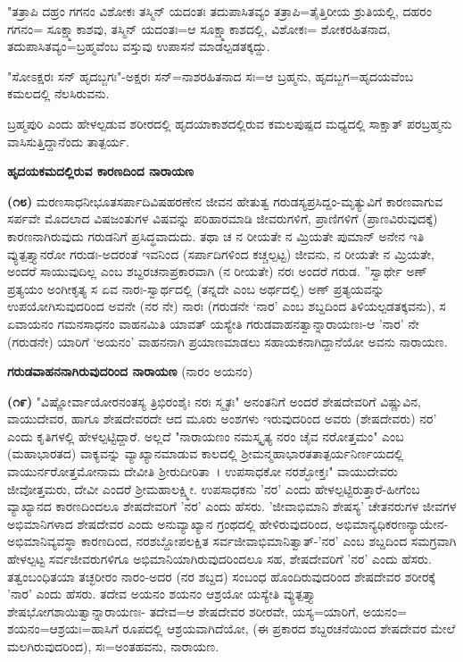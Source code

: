 "ತತ್ರಾಪಿ ದಹ್ರಂ ಗಗನಂ ವಿಶೋಕಃ ತಸ್ಮಿನ್ ಯದಂತಃ ತದುಪಾಸಿತವ್ಯಂ ತತ್ರಾಪಿ=\break ತೈತ್ತಿರೀಯ ಶ್ರುತಿಯಲ್ಲಿ, ದಹರಂ ಗಗನಂ= ಸೂಕ್ಷ್ಮಾಕಾಶವು, ತಸ್ಮಿನ್ ಯದಂತಃ=ಆ ಸೂಕ್ಷ್ಮಾಕಾಶದಲ್ಲಿ, ವಿಶೋಕಃ= ಶೋಕರಹಿತನಾದ, ತದುಪಾಸಿತವ್ಯಂ=ಬ್ರಹ್ಮವೆಂಬ ವಸ್ತುವು ಉಪಾಸನೆ ಮಾಡಲ್ಪಡತಕ್ಕದ್ದು.

"ಸೋಽಕ್ಷರಃ ಸನ್ ಹೃದಬ್ಜಗಃ"-ಅಕ್ಷರಃ ಸನ್=ನಾಶರಹಿತನಾದ ಸಃ=ಆ ಬ್ರಹ್ಮನು, ಹೃದಬ್ಜಗ=ಹೃದಯವೆಂಬ ಕಮಲದಲ್ಲಿ ನೆಲಸಿರುವನು.

ಬ್ರಹ್ಮಪುರಿ ಎಂದು ಹೇಳಲ್ಪಡುವ ಶರೀರದಲ್ಲಿ ಹೃದಯಾಕಾಶದಲ್ಲಿರುವ ಕಮಲಪುಷ್ಪದ ಮಧ್ಯದಲ್ಲಿ ಸಾಕ್ಷಾತ್ ಪರಬ್ರಹ್ಮನು ವಾಸಿಸುತ್ತಿದ್ದಾನೆಂದು ತಾತ್ಪರ್ಯ.

\begin{center}
\textbf{ಹೃದಯಕಮದಲ್ಲಿರುವ ಕಾರಣದಿಂದ ನಾರಾಯಣ}
\end{center}

\textbf{(೧೮)} ಮರಣಸಾಧನೀಭೂತಸರ್ಪಾದಿವಿಷಹರಣೇನ ಜೀವನ ಹೇತುತ್ವ ಗರುಡಸ್ಯ\break ಪ್ರಸಿದ್ದಂ-ಮೃತ್ಯುವಿಗೆ ಕಾರಣವಾಗುವ ಸರ್ಪವೇ ಮೊದಲಾದ ವಿಷಜಂತುಗಳ ವಿಷವನ್ನು ಪರಿಹಾರಮಾಡಿ ಜೀವರುಗಳಿಗೆ, ಪ್ರಾಣಿಗಳಿಗೆ (ಪ್ರಾಣವಿರುವುದಕ್ಕೆ) ಕಾರಣನಾಗಿರುವುದು ಗರುಡನಿಗೆ ಪ್ರಸಿದ್ಧವಾದುದು. ತಥಾ ಚ ನ ರೀಯತೇ ನ ಮ್ರಿಯತೇ ಪುಮಾನ್ ಅನೇನ ಇತಿ ವ್ಯುತ್ಪತ್ತ್ಯಾನರೋ ಗರುಡಃ-ಅದರಂತೆ ಇವನಿಂದ (ಸರ್ಪಾದಿಗಳಿಂದ ಕಚ್ಚಲ್ಪಟ್ಟ) ಜೀವನು, ನ ರೀಯತೇ ನ ಮ್ರಿಯತೇ, ಅಂದರೆ ಸಾಯುವುದಿಲ್ಲ ಎಂಬ ಶಬ್ದರಚನಾಪ್ರಕಾರವಾಗಿ (ನ ರೀಯತೇ) ನರಃ ಅಂದರೆ ಗರುಡ. ''ಸ್ವಾರ್ಥೇ ಅಣ್ ಪ್ರತ್ಯಯಂ ಅಂಗೀಕೃತ್ಯ ಸ ಏವ ನಾರಃ-\-ಸ್ವಾರ್ಥದಲ್ಲಿ (ತನ್ನದೇ ಎಂಬ ಅರ್ಥದಲ್ಲಿ) ಅಣ್ ಪ್ರತ್ಯಯವನ್ನು ಉಪಯೋಗಿಸುವುದರಿಂದ ಅವನೇ (ನರ ನೇ) ನಾರಃ (ಗರುಡನೇ `ನಾರ' ಎಂಬ ಶಬ್ದದಿಂದ ತಿಳಿಯಲ್ಪಡತಕ್ಕವನು), ಸ ಏವಾಯನಂ ಗಮನಸಾಧನಂ ವಾಹನಮಿತಿ ಯಾವತ್‌ ಯಸ್ಯೇತಿ ಗರುಡವಾಹನತ್ವಾನ್ನಾರಾಯಣಃ-ಆ 'ನಾರ' ನೇ (ಗರುಡನೇ) ಯಾರಿಗೆ `ಅಯನಂ' ವಾಹನನಾಗಿ ಪ್ರಯಾಣಮಾಡಲು ಸಹಾಯಕನಾಗಿದ್ದಾನೆಯೋ ಅವನು ನಾರಾಯಣ.

\begin{center}
\textbf{ಗರುಡವಾಹನನಾಗಿರುವುದರಿಂದ ನಾರಾಯಣ} (ನಾರಂ ಅಯನಂ)
\end{center}

\textbf{(೧೯)} "ವಿಷ್ಣೋರ್ವಾಯೋರನಂತಸ್ಯ ತ್ರಿಭಿರಂಶೈಃ ನರಃ ಸ್ಮೃತಃ" ಅನಂತನಿಗೆ ಅಂದರೆ ಶೇಷದೇವರಿಗೆ ವಿಷ್ಣುವಿನ, ವಾಯುದೇವರ, ಹಾಗೂ ಶೇಷದೇವರದೇ ಆದ ಮೂರು ಅಂಶಗಳು ಇರುವುದರಿಂದ ಅವರು (ಶೇಷದೇವರು) ನರ' ಎಂದು ಕೃತಿಗಳಲ್ಲಿ ಹೇಳಲ್ಪಟ್ಟಿದ್ದಾರೆ. ಅಲ್ಲದೆ "ನಾರಾಯಣಂ ನಮಸ್ಕೃತ್ಯ ನರಂ ಚೈವ ನರೋತ್ತಮಂ" ಎಂಬ (ಮಹಾಭಾರತದ) ವಾಕ್ಯವನ್ನು ವ್ಯಾಖ್ಯಾನಮಾಡುವ ಕಾಲದಲ್ಲಿ ಶ‍್ರೀಮನ್ಮಹಾಭಾರತತಾತ್ಪರ್ಯನಿರ್ಣಯದಲ್ಲಿ ವಾಯುರ್ನರೋತ್ತಮೋನಾಮ ದೇವೀತಿ ಶ‍್ರೀರುದೀರಿತಾ~। ಉಪಸಾಧಕೋ ನರಶ್ಛೋಕ್ತಃ" ವಾಯುದೇವರು ಜೀವೋತ್ತಮರು, ದೇವೀ ಎಂದರೆ ಶ‍್ರೀಮಹಾಲಕ್ಷ್ಮೀ. ಉಪಸಾಧಕನು 'ನರ' ಎಂದು ಹೇಳಲ್ಪಟ್ಟಿರುತ್ತಾರೆ-ಹೀಗೆಂಬ ವ್ಯಾಖ್ಯಾನದ ಕಾರಣದಿಂದಲೂ ಶೇಷದೇವರಿಗೆ 'ನರ' ಎಂದು ಹೆಸರು. 'ಜೀವಾಭಿಮಾನಿ ಶೇಷಸ್ಯ' ಚೇತನರುಗಳ ಜೀವಗಳ ಅಭಿಮಾನಿಗಳಾದ ಶೇಷದೇವರ ಎಂದು ಅನುವ್ಯಾಖ್ಯಾನ ಗ್ರಂಥದಲ್ಲಿ ಹೇಳಿರುವುದರಿಂದ, ಅಭಿಮಾನ್ಯಧಿಕರಣ\-ನ್ಯಾಯೇನ-ಅಭಿಮಾನಿವ್ಯವಸ್ಥಾ ಕಾರಣದಿಂದ, ನರಶಬ್ದೋಪಲಕ್ಷಿತ ಸರ್ವಜೀವಾಭಿಮಾನಿ\-ತ್ವಾತ್-'ನರ' ಎಂಬ ಶಬ್ದದಿಂದ ಸಮಗ್ರವಾಗಿ ಹೇಳಲ್ಪಟ್ಟ ಸರ್ವಜೀವರುಗಳಿಗೂ ಅಭಿಮಾನಿಯಾಗಿರುವುದರಿಂದಲೂ ಸಹ, ಶೇಷದೇವರಿಗೆ 'ನರ' ಎಂದು ಹೆಸರು. ತತ್ವಂಬಂಧಿತಯಾ ತಚ್ಛರೀರಂ ನಾರಂ-ಅದರ (ನರ ಶಬ್ದದ) ಸಂಬಂಧ ಹೊಂದಿರುವುದರಿಂದ ಶೇಷದೇವರ ಶರೀರಕ್ಕೆ 'ನಾರ' ಎಂದು ಹೆಸರು. ತದೇವ ಅಯನಂ ಶಯನಂ ಆಶ್ರಯೋ ಯಸ್ಯೇತಿ ವ್ಯುತ್ಪತ್ತ್ಯಾ ಶೇಷಭೋಗಶಾಯಿತ್ವಾನ್ನಾರಾಯಣಃ- ತದೇವ=ಆ ಶೇಷದೇವರ ಶರೀರವೇ, ಯಸ್ಯ=\break ಯಾರಿಗೆ, ಅಯನಂ= ಶಯನಂ=ಆಶ್ರಯಃ=ಹಾಸಿಗೆ ರೂಪದಲ್ಲಿ ಆಶ್ರಯವಾಗಿದೆಯೋ, (ಈ ಪ್ರಕಾರದ ಶಬ್ದರಚನೆಯಿಂದ ಶೇಷದೇವರ ಮೇಲೆ ಮಲಗಿರುವುದರಿಂದ), ಸಃ=ಅಂತಹವನು, ನಾರಾಯಣ.

